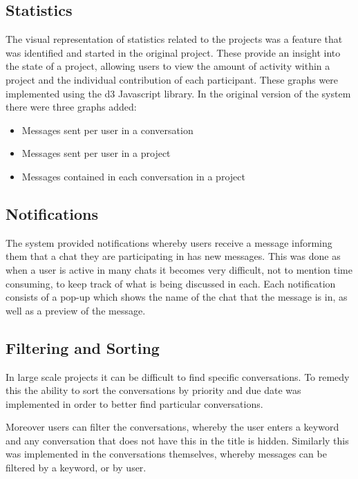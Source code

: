 \documentclass{l4proj}
\begin{document}
\subsection{Statistics}

The visual representation of statistics related to the projects was a feature that was identified and started in the original project.  These provide an insight into the state of a project, allowing users to view the amount of activity within a project and the individual contribution of each participant.  These graphs were implemented using the d3 Javascript library.
In the original version of the system there were three graphs added:

\begin{itemize}
\item Messages sent per user in a conversation
\item Messages sent per user in a project
\item Messages contained in each conversation in a project
\end{itemize}

\subsection{Notifications}

The system provided notifications whereby users receive a message informing them that a chat they are participating in has new messages.  This was done as when a user is active in many chats it becomes very difficult, not to mention time consuming, to keep track of what is being discussed in each.  Each notification consists of a pop-up which shows the name of the chat that the message is in, as well as a preview of the message.

\subsection{Filtering and Sorting}

In large scale projects it can be difficult to find specific conversations.  To remedy this the ability to sort the conversations by priority and due date was implemented in order to better find particular conversations. 

Moreover users can filter the conversations, whereby the user enters a keyword and any conversation that does not have this in the title is hidden.  Similarly this was implemented in the conversations themselves, whereby messages can be filtered by a keyword, or by user.
\end{document}
